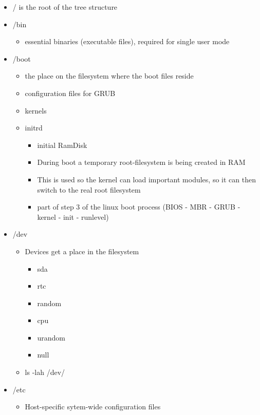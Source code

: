 \documentclass{article}
\begin{document}
\begin{itemize}
    \item / is the root of the tree structure
    \item /bin 
    \begin{itemize}
        \item essential binaries (executable files), required for single user mode
    \end{itemize}
    \item /boot
    \begin{itemize}
        \item the place on the filesystem where the boot files reside
        \item configuration files for GRUB
        \item kernels
        \item initrd
        \begin{itemize}
            \item initial RamDisk
            \item During boot a temporary root-filesystem is being created in RAM
            \item This is used so the kernel can load important modules, so it can then switch to the real root filesystem
            \item part of step 3 of the linux boot process (BIOS - MBR - GRUB - kernel - init - runlevel)
        \end{itemize}
    \end{itemize}
    \item /dev
    \begin{itemize}
        \item Devices get a place in the filesystem
        \begin{itemize}
            \item sda
            \item rtc
            \item random
            \item cpu
            \item urandom
            \item null
        \end{itemize}
        \item ls -lah /dev/
    \end{itemize}
    \item /etc
    \begin{itemize}
        \item Host-specific sytem-wide configuration files

\end{itemize}
\end{itemize}
\end{document}
